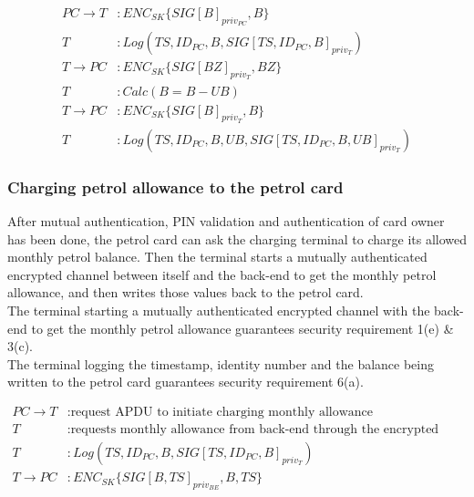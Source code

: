\begin{equation}\nonumber
\begin{split}
PC \to T&: ENC_{SK}\{SIG[B]_{priv_{PC}}, B\}\\
T&: Log(TS, ID_{PC}, B, SIG[TS, ID_{PC}, B]_{priv_T}) \\
T \to PC&: ENC_{SK}\{SIG[BZ]_{priv_T}, BZ\}\\
T&: Calc(B = B - UB)\\
T \to PC&: ENC_{SK}\{SIG[B]_{priv_T}, B\}\\
T&: Log(TS, ID_{PC}, B, UB, SIG[TS, ID_{PC}, B, UB]_{priv_T})
\end{split} 
\end{equation}


\subsubsection{Charging petrol allowance to the petrol card}
After mutual authentication, PIN validation and authentication of card owner
has been done, the petrol card can ask the charging terminal to charge its
allowed monthly petrol balance. Then the terminal starts a mutually
authenticated encrypted channel between itself and the back-end to get the monthly petrol allowance, and then
writes those values back to the petrol card.\\

The terminal starting a mutually authenticated encrypted channel with the back-end to get the monthly petrol allowance guarantees security requirement 1(e) \& 3(c).\\

The terminal logging the timestamp, identity number and the balance being written to the petrol card guarantees security requirement 6(a).

\begin{equation}\nonumber
\begin{split}
PC \to T&: \text{request APDU to initiate charging monthly allowance} \\
T&: \text{requests monthly allowance from back-end through the encrypted channel} \\
T&: Log(TS, ID_{PC}, B, SIG[TS, ID_{PC}, B]_{priv_T}) \\
T \to PC&: ENC_{SK}\{SIG[B,TS]_{priv_{BE}}, B, TS\}
\end{split} 
\end{equation}
